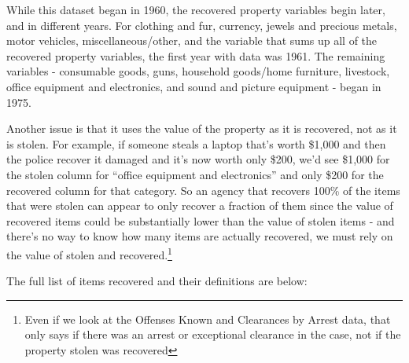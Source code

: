 \documentclass[
  12pt,
  openany]{book}
\begin{document}
While this dataset began in 1960, the recovered property variables begin later, and in different years. For clothing and fur, currency, jewels and precious metals, motor vehicles, miscellaneous/other, and the variable that sums up all of the recovered property variables, the first year with data was 1961. The remaining variables - consumable goods, guns, household goods/home furniture, livestock, office equipment and electronics, and sound and picture equipment - began in 1975.

Another issue is that it uses the value of the property as it is recovered, not as it is stolen. For example, if someone steals a laptop that's worth \$1,000 and then the police recover it damaged and it's now worth only \$200, we'd see \$1,000 for the stolen column for ``office equipment and electronics'' and only \$200 for the recovered column for that category. So an agency that recovers 100\% of the items that were stolen can appear to only recover a fraction of them since the value of recovered items could be substantially lower than the value of stolen items - and there's no way to know how many items are actually recovered, we must rely on the value of stolen and recovered.\footnote{Even if we look at the Offenses Known and Clearances by Arrest data, that only says if there was an arrest or exceptional clearance in the case, not if the property stolen was recovered}

The full list of items recovered and their definitions are below:
\end{document}
